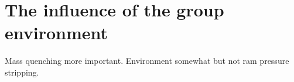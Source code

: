 \chapter{The influence of the group environment}

Mass quenching more important. Environment somewhat but not ram pressure stripping. 